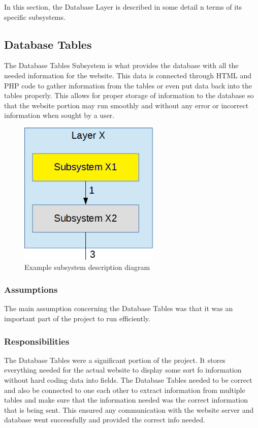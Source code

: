 In this section, the Database Layer is described in some detail n terms of its specific subsystems.

\subsection{Database Tables}
The Database Tables Subsystem is what provides the database with all the needed information for the website. This data is connected through HTML and PHP code to gather information from the tables or even put data back into the tables properly. This allows for proper storage of information to the database so that the website portion may run smoothly and without any error or incorrect information when sought by a user.

\begin{figure}[h!]
	\centering
 	\includegraphics[width=0.60\textwidth]{images/subsystem}
 \caption{Example subsystem description diagram}
\end{figure}

\subsubsection{Assumptions}
The main assumption concerning the Database Tables was that it was an important part of the project to run efficiently.

\subsubsection{Responsibilities}
The Database Tables were a significant portion of the project. It stores everything needed for the actual website to display some sort fo information without hard coding data into fields. The Database Tables needed to be correct and also be connected to one each other to extract information from multiple tables and make sure that the information needed was the correct information that is being sent. This ensured any communication with the website server and database went successfully and provided the correct info needed.


